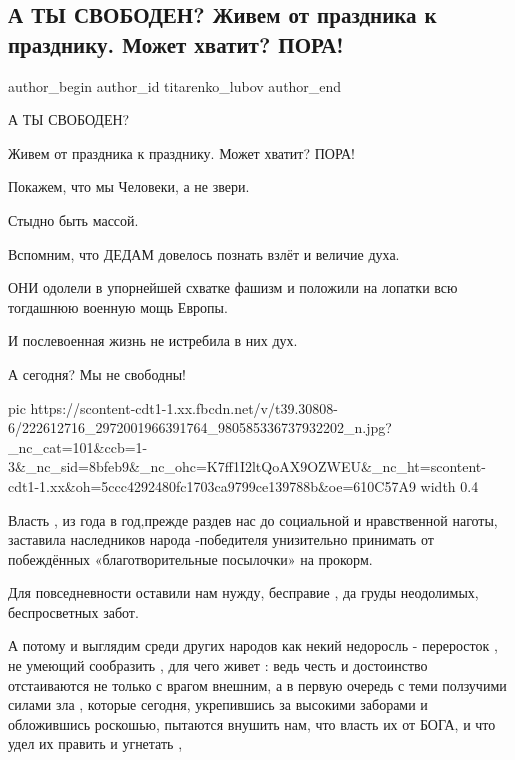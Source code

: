  
 
 
 
 
 
\subsection{А ТЫ СВОБОДЕН? Живем от праздника к празднику. Может хватит? ПОРА!}
\label{sec:28_07_2021.fb.titarenko_lubov.1.a_ty_svoboden}
 
\ifcmt
 author_begin
   author_id titarenko_lubov
 author_end
\fi

А ТЫ СВОБОДЕН?

Живем от праздника к празднику. Может хватит? ПОРА!

Покажем, что мы Человеки, а не звери.

Стыдно быть массой.

Вспомним, что  ДЕДАМ  довелось познать взлёт и величие духа. 

ОНИ одолели в упорнейшей схватке фашизм и положили на лопатки всю тогдашнюю
военную мощь Европы. 

И послевоенная жизнь не истребила в них дух. 

А сегодня?  Мы не свободны!

\ifcmt
  pic https://scontent-cdt1-1.xx.fbcdn.net/v/t39.30808-6/222612716_2972001966391764_980585336737932202_n.jpg?_nc_cat=101&ccb=1-3&_nc_sid=8bfeb9&_nc_ohc=K7ff1I2ltQoAX9OZWEU&_nc_ht=scontent-cdt1-1.xx&oh=5ccc4292480fc1703ca9799ce139788b&oe=610C57A9
  width 0.4
\fi

Власть , из года в год,прежде раздев нас до социальной и нравственной наготы,
заставила  наследников народа -победителя унизительно принимать  от побеждённых
«благотворительные посылочки» на прокорм.

Для повседневности  оставили нам нужду, бесправие , 
да груды неодолимых, беспросветных забот.

А потому и выглядим среди других народов  как некий недоросль - переросток , не
умеющий сообразить , для чего живет : ведь честь и достоинство отстаиваются не
только с врагом внешним, а в первую очередь  с теми ползучими силами зла ,
которые сегодня, укрепившись за высокими заборами  и обложившись роскошью,
пытаются внушить нам, что власть их от БОГА, и что удел их править и угнетать ,

